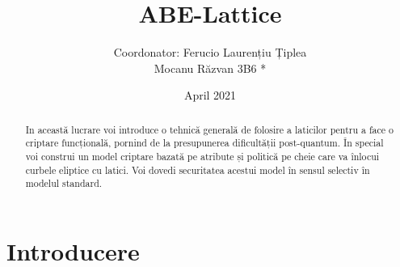 \documentclass{article}
\title{ABE-Lattice}
\author{Coordonator: Ferucio Laurențiu Țiplea \\ Mocanu Răzvan 3B6 *}
\date{April 2021}
\begin{document}
\maketitle

\tableofcontents
	

   	
\clearpage
\begin{center} 
\begin{abstract}
In această lucrare voi introduce o tehnică generală de folosire a laticilor pentru a face
o criptare funcțională, pornind de la presupunerea dificultății post-quantum. În special voi 
construi un model criptare bazată pe atribute și politică pe cheie care va înlocui curbele eliptice cu latici. Voi dovedi securitatea acestui model în sensul selectiv în modelul standard.
\end{abstract}
\end{center}

\section{Introducere}
\end{document}
